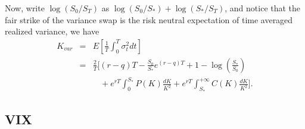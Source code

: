\documentclass[12pt]{article}
\begin{document}
    Now, write $\log(S_0/S_T)$ as $\log(S_0/S_*)+\log(S_*/S_T)$, and notice that the fair strike of the variance swap is
    the risk neutral expectation of time averaged realized variance, we have
    \begin{eqnarray}
      K_{var} &=& E\left[\frac{1}{T}\int_0^T\sigma_t^2dt\right]\nonumber\\
              &=& \frac{2}{T}\Bigg[(r-q)T-\frac{S_0}{S_*}e^{(r-q)T}+1-\log\left(\frac{S_*}{S_0}\right)\nonumber\\
              &&\ \ \ \ +e^{rT}\int_0^{S_*}P(K)\frac{dK}{K^2}+e^{rT}\int_{S_*}^{+\infty}C(K)\frac{dK}{K^2}\Bigg].
      \label{VarSwapRate}
    \end{eqnarray}

  \subsection{VIX}
\end{document}
